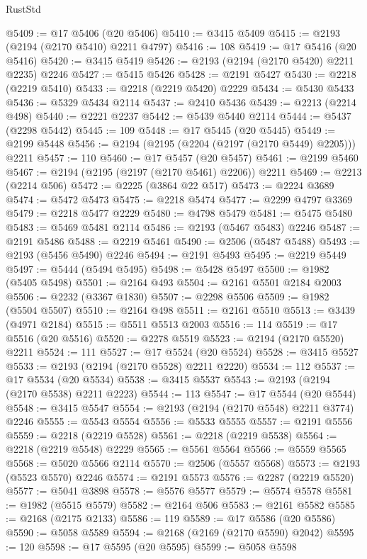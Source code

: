 \begin{lexlean}{RustStd}
\begin{coremodule}
@5409 := @17 @5406 (@20 @5406)
@5410 := @3415 @5409
@5415 := @2193 (@2194 (@2170 @5410) @2211 @4797)
@5416 := 108
@5419 := @17 @5416 (@20 @5416)
@5420 := @3415 @5419
@5426 := @2193 (@2194 (@2170 @5420) @2211 @2235) @2246
@5427 := @5415 @5426
@5428 := @2191 @5427
@5430 := @2218 (@2219 @5410)
@5433 := @2218 (@2219 @5420) @2229
@5434 := @5430 @5433
@5436 := @5329 @5434 @2114
@5437 := @2410 @5436
@5439 := @2213 (@2214 @498)
@5440 := @2221 @2237
@5442 := @5439 @5440 @2114
@5444 := @5437 (@2298 @5442)
@5445 := 109
@5448 := @17 @5445 (@20 @5445)
@5449 := @2199 @5448
@5456 := @2194 (@2195 (@2204 (@2197 (@2170 @5449) @2205))) @2211
@5457 := 110
@5460 := @17 @5457 (@20 @5457)
@5461 := @2199 @5460
@5467 := @2194 (@2195 (@2197 (@2170 @5461) @2206)) @2211
@5469 := @2213 (@2214 @506)
@5472 := @2225 (@3864 @22 @517)
@5473 := @2224 @3689
@5474 := @5472 @5473
@5475 := @2218 @5474
@5477 := @2299 @4797 @3369
@5479 := @2218 @5477 @2229
@5480 := @4798 @5479
@5481 := @5475 @5480
@5483 := @5469 @5481 @2114
@5486 := @2193 (@5467 @5483) @2246
@5487 := @2191 @5486
@5488 := @2219 @5461
@5490 := @2506 (@5487 @5488)
@5493 := @2193 (@5456 @5490) @2246
@5494 := @2191 @5493
@5495 := @2219 @5449
@5497 := @5444 (@5494 @5495)
@5498 := @5428 @5497
@5500 := @1982 (@5405 @5498)
@5501 := @2164 @493
@5504 := @2161 @5501 @2184 @2003
@5506 := @2232 (@3367 @1830)
@5507 := @2298 @5506
@5509 := @1982 (@5504 @5507)
@5510 := @2164 @498
@5511 := @2161 @5510
@5513 := @3439 (@4971 @2184)
@5515 := @5511 @5513 @2003
@5516 := 114
@5519 := @17 @5516 (@20 @5516)
@5520 := @2278 @5519
@5523 := @2194 (@2170 @5520) @2211
@5524 := 111
@5527 := @17 @5524 (@20 @5524)
@5528 := @3415 @5527
@5533 := @2193 (@2194 (@2170 @5528) @2211 @2220)
@5534 := 112
@5537 := @17 @5534 (@20 @5534)
@5538 := @3415 @5537
@5543 := @2193 (@2194 (@2170 @5538) @2211 @2223)
@5544 := 113
@5547 := @17 @5544 (@20 @5544)
@5548 := @3415 @5547
@5554 := @2193 (@2194 (@2170 @5548) @2211 @3774) @2246
@5555 := @5543 @5554
@5556 := @5533 @5555
@5557 := @2191 @5556
@5559 := @2218 (@2219 @5528)
@5561 := @2218 (@2219 @5538)
@5564 := @2218 (@2219 @5548) @2229
@5565 := @5561 @5564
@5566 := @5559 @5565
@5568 := @5020 @5566 @2114
@5570 := @2506 (@5557 @5568)
@5573 := @2193 (@5523 @5570) @2246
@5574 := @2191 @5573
@5576 := @2287 (@2219 @5520)
@5577 := @5041 @3898
@5578 := @5576 @5577
@5579 := @5574 @5578
@5581 := @1982 (@5515 @5579)
@5582 := @2164 @506
@5583 := @2161 @5582
@5585 := @2168 (@2175 @2133)
@5586 := 119
@5589 := @17 @5586 (@20 @5586)
@5590 := @5058 @5589
@5594 := @2168 (@2169 (@2170 @5590) @2042)
@5595 := 120
@5598 := @17 @5595 (@20 @5595)
@5599 := @5058 @5598

\end{coremodule}
\end{lexlean}
